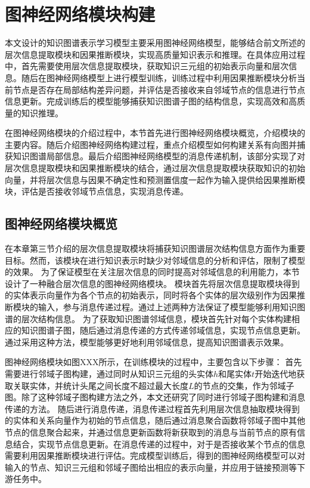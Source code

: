 \documentclass[algorithmlist, AutoFakeBold, AutoFakeSlant, figurelist, tablelist, nomlist, masters]{seuthesix}
\begin{document}
\section{图神经网络模块构建}
本文设计的知识图谱表示学习模型主要采用图神经网络模型，能够结合前文所述的层次信息提取模块和因果推断模块，实现高质量知识表示和推理。在具体应用过程中，首先需要使用层次信息提取模块，获取知识三元组的初始表示向量和层次信息。随后在图神经网络模型上进行模型训练，训练过程中利用因果推断模块分析当前节点是否存在局部结构差异问题，并评估是否接收来自邻域节点的信息进行节点信息更新。完成训练后的模型能够捕获知识图谱子图的结构信息，实现高效和高质量的知识推理。

在图神经网络模块的介绍过程中，本节首先进行图神经网络模块概览，介绍模块的主要内容。随后介绍图神经网络构建过程，重点介绍模型如何构建关系有向图并捕获知识图谱局部信息。最后介绍图神经网络模型的消息传递机制，该部分实现了对层次信息提取模块和因果推断模块的结合，通过层次信息提取模块获取知识的初始向量，并将层次信息与因果不确定性和预测置信度一起作为输入提供给因果推断模块，评估是否接收邻域节点信息，实现消息传递。

\subsection{图神经网络模块概览}
在本章第三节介绍的层次信息提取模块将捕获知识图谱层次结构信息方面作为重要目标。然而，该模块在进行知识表示时缺少对邻域信息的分析和评估，限制了模型的效果。
为了保证模型在关注层次信息的同时提高对邻域信息的利用能力，本节设计了一种融合层次信息的图神经网络模块。
模块首先将层次信息提取模块得到的实体表示向量作为各个节点的初始表示，同时将各个实体的层次级别作为因果推断模块的输入，参与消息传递过程。通过上述两种方法保证了模型能够利用知识图谱的层次结构信息。
为了获取知识图谱邻域信息，模块首先针对每个实体构建相应的知识图谱子图，随后通过消息传递的方式传递邻域信息，实现节点信息更新。通过采用这种方法，模型能够更好地利用邻域信息，提高知识图谱表示效果。

图神经网络模块如图XXX所示，在训练模块的过程中，主要包含以下步骤：
首先需要进行邻域子图构建，通过同时从知识三元组的头实体$h$和尾实体$t$开始迭代地获取关联实体，并统计头尾之间长度不超过最大长度$L$的节点的交集，作为邻域子图。除了这种邻域子图构建方法之外，本文还研究了同时进行邻域子图构建和消息传递的方法。 %
随后进行消息传递，消息传递过程首先利用层次信息抽取模块得到的实体和关系向量作为初始的节点信息，随后通过消息聚合函数将邻域子图中其他节点的信息聚合起来，并通过信息更新函数将新获取到的消息与当前节点的原有信息结合，实现节点信息更新。在消息传递的过程中，对于是否接收某个节点的信息需要利用因果推断模块进行评估。完成模型训练后，得到的图神经网络模型可以对输入的节点、知识三元组和邻域子图给出相应的表示向量，并应用于链接预测等下游任务中。
\end{document}
